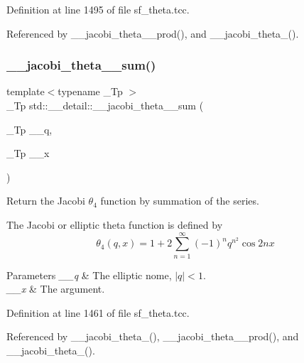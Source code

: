 Definition at line 1495 of file sf\+\_\+theta.\+tcc.



Referenced by \+\_\+\+\_\+jacobi\+\_\+theta\+\_\+\_\+prod(), and \+\_\+\+\_\+jacobi\+\_\+theta\+\_().

\mbox{\label{namespacestd_1_1____detail_a6f1dd356335537ad693089ccb8d8c755}} 
\subsubsection{\texorpdfstring{\+\_\+\+\_\+jacobi\+\_\+theta\+\_\+\_\+sum()}{\_\_jacobi\_theta\_4\_sum()}}
{\footnotesize\ttfamily template$<$typename \+\_\+\+Tp $>$ \\
\+\_\+\+Tp std\+::\+\_\+\+\_\+detail\+::\+\_\+\+\_\+jacobi\+\_\+theta\+\_\+\_\+sum (\begin{DoxyParamCaption}\item[{\+\_\+\+Tp}]{\+\_\+\+\_\+q,  }\item[{\+\_\+\+Tp}]{\+\_\+\+\_\+x }\end{DoxyParamCaption})}

Return the Jacobi $ \theta_4 $ function by summation of the series.

The Jacobi or elliptic theta function is defined by \[ \theta_4(q,x) = 1 + 2\sum_{n=1}^{\infty}(-1)^n q^{n^2}\cos{2nx} \]


\begin{DoxyParams}{Parameters}
{\em \+\_\+\+\_\+q} & The elliptic nome, $ |q| < 1 $. \\
\hline
{\em \+\_\+\+\_\+x} & The argument. \\
\hline
\end{DoxyParams}


Definition at line 1461 of file sf\+\_\+theta.\+tcc.



Referenced by \+\_\+\+\_\+jacobi\+\_\+theta\+\_(), \+\_\+\+\_\+jacobi\+\_\+theta\+\_\+\_\+prod(), and \+\_\+\+\_\+jacobi\+\_\+theta\+\_().

\mbox{\label{namespacestd_1_1____detail_a53800598007d45e144cf147c2408a3d6}} 
